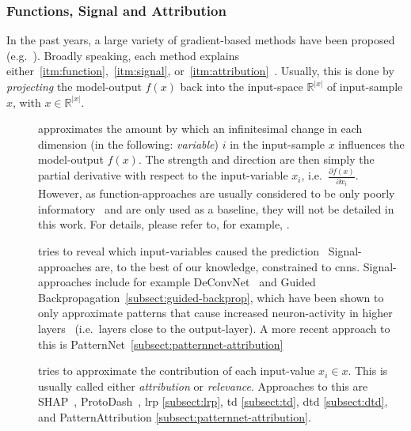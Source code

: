 \subsubsection{Functions, Signal and Attribution} In the past years, a large variety of gradient-based methods have been proposed (e.g.~\cite{Bach.2015,Zeiler.2014,Springenberg.2015,Kindermans.2018,Lundberg.2017,Gurumoorthy.2017,Simonyan.2014,DanielSmilkov.,Sundararajan.2017,Landecker.2013,Zhang.2018,Shrikumar.,Selvaraju.2017}). Broadly speaking, each method explains either~\ref{itm:function},~\ref{itm:signal}, or~\ref{itm:attribution}~\cite{Kindermans.2018,Kindermans.2019}. Usually, this is done by \textit{projecting} the model-output \(f(x)\) back into the input-space \(\mathbb{R}^{|x|}\) of input-sample \(x\), with \(x\in \mathbb{R}^{|x|}\).
\begin{description}
    \item[] approximates the amount by which an infinitesimal change in each dimension (in the following: \textit{variable}) \(i\) in the input-sample \(x\) influences the model-output \(f(x)\). The strength and direction are then simply the partial derivative with respect to the input-variable \(x_i\), i.e.\ \(\frac{\partial f(x)}{\partial x_i}\). However, as function-approaches are usually considered to be only poorly informatory~\cite{Kindermans.2018} and are only used as a baseline, they will not be detailed in this work. For details, please refer to, for example, .
    \item[] tries to reveal which input-variables caused the prediction~\cite{Kindermans.2018,Zeiler.2014} Signal-approaches are, to the best of our knowledge, constrained to \glspl{cnn}. Signal-approaches include for example DeConvNet~\cite{Zeiler.2014} and Guided Backpropagation~\cref{subsect:guided-backprop}, which have been shown to only approximate patterns that cause increased neuron-activity in higher layers~\cite{Kindermans.2019} (i.e.\ layers close to the output-layer). A more recent approach to this is PatternNet~\cref{subsect:patternnet-attribution}
    \item[] tries to approximate the contribution of each input-value \(x_i\in x\). This is usually called either \textit{attribution} or \textit{relevance}. Approaches to this are SHAP~\cite{Lundberg.2017}, ProtoDash~\cite{Gurumoorthy.2017}, \gls{lrp} \cref{subsect:lrp}, \gls{td} \cref{subsect:td}, \gls{dtd} \cref{subsect:dtd}, and PatternAttribution \cref{subsect:patternnet-attribution}.
\end{description}

